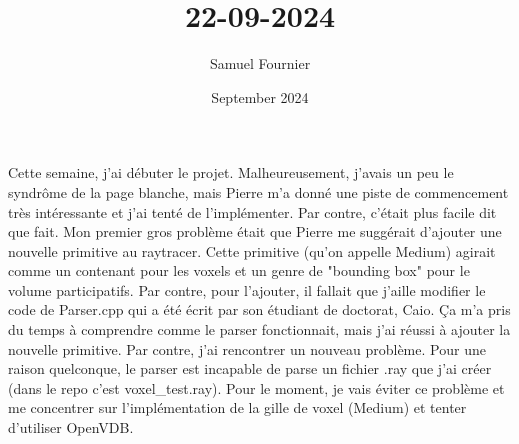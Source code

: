 \documentclass{article}
\title{22-09-2024}
\author{Samuel Fournier}
\date{September 2024}
\begin{document}
\maketitle

Cette semaine, j'ai débuter le projet. Malheureusement, j'avais un peu le syndrôme de la page blanche, mais Pierre m'a
donné une piste de commencement très intéressante et j'ai tenté de l'implémenter. Par contre, c'était plus facile dit
que fait. Mon premier gros problème était que Pierre me suggérait d'ajouter une nouvelle primitive au raytracer. Cette
primitive (qu'on appelle Medium) agirait comme un contenant pour les voxels et un genre de "bounding box" pour le volume
participatifs. Par contre, pour l'ajouter, il fallait que j'aille modifier le code de Parser.cpp qui a été écrit par son
étudiant de doctorat, Caio. Ça m'a pris du temps à comprendre comme le parser fonctionnait, mais j'ai réussi à ajouter
la nouvelle primitive. Par contre, j'ai rencontrer un nouveau problème. Pour une raison quelconque, le parser est
incapable de parse un fichier .ray que j'ai créer (dans le repo c'est voxel\_test.ray). Pour le moment, je vais éviter
ce problème et me concentrer sur l'implémentation de la gille de voxel (Medium) et tenter d'utiliser OpenVDB.
\end{document}
